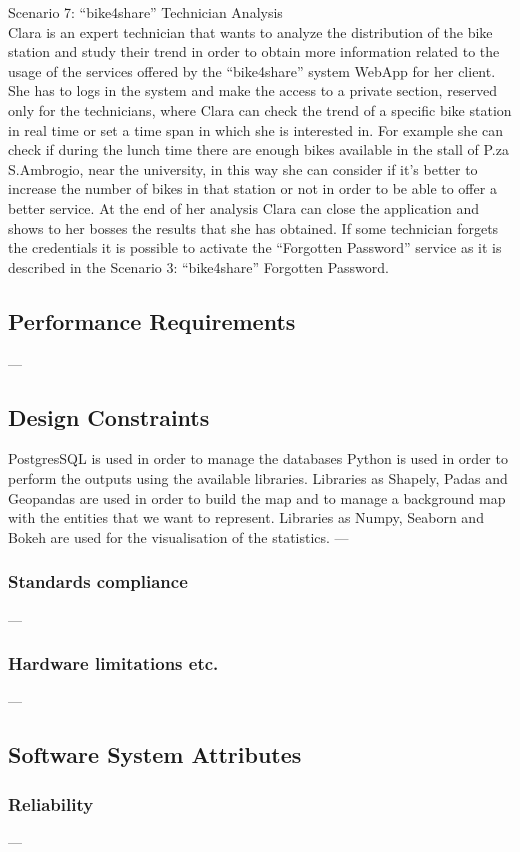 \documentclass{article}
\begin{document}
Scenario 7: “bike4share” Technician Analysis \\
Clara is an expert technician that wants to analyze the distribution of the bike station and study their trend in order to obtain more information related to the usage of the services offered by the “bike4share” system WebApp for her client.
She has to logs in the system and make the access to a private section, reserved only for the technicians, where Clara can check the trend of a specific bike station in real time or set a time span in which she is interested in. For example she can check if during the lunch time there are enough bikes available in the stall of P.za S.Ambrogio, near the university, in this way she can consider if it’s better to increase the number of bikes in that station or not in order to be able to offer a better service.
At the end of her analysis Clara can close the application and shows to her bosses the results that she has obtained.
If some technician forgets the credentials it is possible to activate the “Forgotten Password” service as it is described in the Scenario 3: “bike4share” Forgotten Password.

\subsection{Performance Requirements}
---
\subsection{Design Constraints}
PostgresSQL is used in order to manage the databases
Python is used in order to perform the outputs using the available libraries. 
Libraries as Shapely, Padas and Geopandas are used in order to build the map and to manage a background map with the entities that we want to represent.
Libraries as Numpy, Seaborn and Bokeh are used for the visualisation of the statistics. 
---
\subsubsection{Standards compliance} 
---
\subsubsection{Hardware limitations etc.}
---
\subsection{Software System Attributes}
\subsubsection{Reliability}
---
\end{document}
